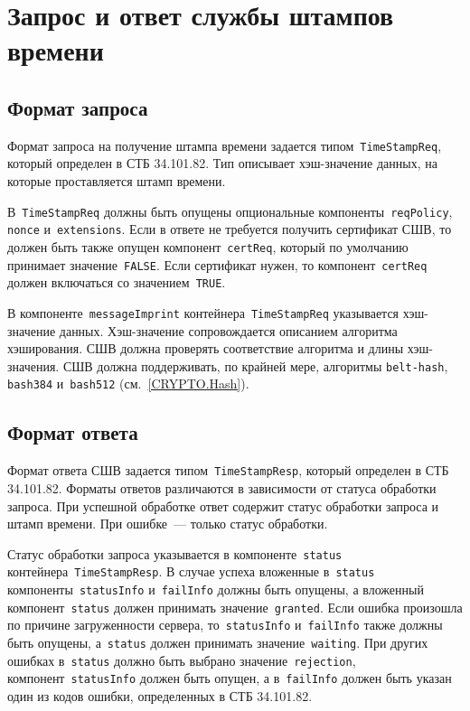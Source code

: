 \section{Запрос и ответ службы штампов времени}\label{FMT.TSP}

\subsection{Формат запроса}\label{FMT.TSP.Req}

Формат запроса на получение штампа времени задается 
типом~\texttt{TimeStampReq}, который определен в СТБ 34.101.82. Тип 
описывает хэш-значение данных, на которые проставляется штамп времени.

В~\texttt{TimeStampReq} должны быть опущены опциональные 
компоненты~\texttt{reqPolicy}, \texttt{nonce} и~\texttt{extensions}. 
%
Если в ответе не требуется получить сертификат СШВ, 
то должен быть также опущен компонент~\texttt{certReq},
который по умолчанию принимает значение~\texttt{FALSE}.
%
Если сертификат нужен, то компонент~\texttt{certReq}
должен включаться со значением~\texttt{TRUE}.

В компоненте~\texttt{messageImprint} контейнера~\texttt{TimeStampReq}
указывается хэш-значение данных. 
Хэш-значение сопровождается описанием алгоритма хэширования.
СШВ должна проверять соответствие алгоритма и длины хэш-значения.
СШВ должна поддерживать, по крайней мере, алгоритмы \texttt{belt-hash},
\texttt{bash384} и~\texttt{bash512} (см.~\ref{CRYPTO.Hash}).

\subsection{Формат ответа}\label{FMT.TSP.Resp}
 
Формат ответа СШВ задается типом~\texttt{TimeStampResp}, который определен 
в СТБ 34.101.82. Форматы ответов различаются в зависимости от статуса 
обработки запроса. При успешной обработке ответ содержит статус обработки 
запроса и штамп времени. При ошибке~--- только статус обработки.

Статус обработки запроса указывается в компоненте~\texttt{status}
контейнера~\texttt{TimeStampResp}.
%
В случае успеха вложенные в~\texttt{status} компоненты~\texttt{statusInfo} 
и~\texttt{failInfo} должны быть опущены, а вложенный
компонент~\texttt{status} должен принимать значение~\texttt{granted}.
%
Если ошибка произошла по причине загруженности сервера, 
то~\texttt{statusInfo} и~\texttt{failInfo} также должны быть опущены, 
а~\texttt{status} должен принимать значение~\texttt{waiting}.
%
При других ошибках в~\texttt{status} должно быть выбрано 
значение~\texttt{rejection}, компонент~\texttt{statusInfo}
должен быть опущен, а в~\texttt{failInfo} должен быть указан один из 
кодов ошибки, определенных в СТБ 34.101.82.

